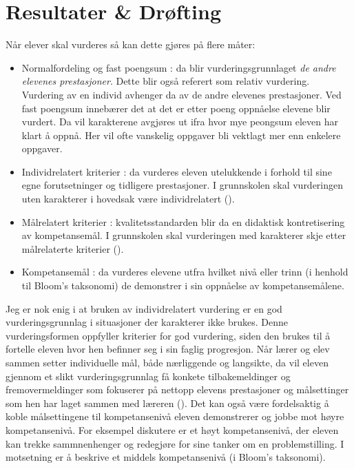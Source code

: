 \documentclass[main.tex]{subfiles}
\begin{document}
\section*{Resultater \& Drøfting}
\label{sec:4}

Når elever skal vurderes så kan dette gjøres på flere måter:
\begin{itemize}
\item Normalfordeling og fast poengsum : da blir vurderingsgrunnlaget \emph{de andre elevenes prestasjoner}. 
Dette blir også referert som relativ vurdering. Vurdering av en individ avhenger da av de andre
elevenes prestasjoner. Ved fast poengsum innebærer det at det er etter poeng oppnåelse elevene blir vurdert. 
Da vil karakterene avgjøres ut ifra hvor mye peongsum eleven har klart å oppnå. Her vil ofte vanskelig oppgaver
bli vektlagt mer enn enkelere oppgaver.
\item Individrelatert kriterier : da vurderes eleven utelukkende i forhold til sine egne forutsetninger
og tidligere prestasjoner. I grunnskolen skal vurderingen uten karakterer i hovedsak være 
individrelatert  ().
\item Målrelatert kriterier : kvalitetsstandarden blir da en didaktisk kontretisering av kompetansemål.
I grunnskolen skal vurderingen med karakterer skje etter målrelaterte kriterier ().
\item Kompetansemål : da vurderes elevene utfra hvilket nivå eller trinn (i henhold til Bloom's taksonomi) 
                      de demonstrer i sin oppnåelse av kompetansemålene.
\end{itemize}
Jeg er nok enig i at bruken av individrelatert vurdering er en god vurderingsgrunnlag i situasjoner
der karakterer ikke brukes. Denne vurderingsformen oppfyller kriterier for god vurdering, siden den brukes til å 
fortelle eleven hvor hen befinner seg i sin faglig progresjon. Når lærer og elev sammen setter individuelle mål, både 
nærliggende og langsikte, da vil eleven gjennom et slikt vurderingsgrunnlag få konkete tilbakemeldinger og 
fremovermeldinger som fokuserer på nettopp elevens prestasjoner og målsettinger som hen har laget sammen med
læreren (). Det kan også være fordelsaktig å koble målsettingene til kompetansenivå eleven 
demonstrerer og jobbe mot høyre kompetansenivå. For eksempel diskutere er et høyt kompetansenivå, der eleven 
kan trekke sammnenhenger og redegjøre for sine tanker om en problemstilling. I motsetning er å beskrive et middels 
kompetansenivå (i Bloom's taksonomi).
\end{document}
